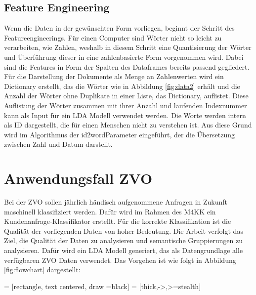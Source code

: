 \documentclass[german,version-2020-11]{uzl-thesis}
\begin{document}
\begin{itemize}
\subsection{Feature Engineering}
Wenn die Daten in der gewünschten Form vorliegen, beginnt der Schritt des Featureengineerings. Für einen Computer sind Wörter nicht so leicht zu verarbeiten, wie Zahlen, weshalb in diesem Schritt eine Quantisierung der Wörter und Überführung dieser in eine zahlenbasierte Form vorgenommen wird. Dabei sind die Features in Form der Spalten des Dataframes bereits passend gegliedert. Für die Darstellung der Dokumente als Menge an Zahlenwerten wird ein Dictionary erstellt, das die Wörter wie in Abbildung \ref{fig:data2} erhält und die Anzahl der Wörter ohne Duplikate in einer Liste, das Dictionary, auflistet. Diese Auflistung der Wörter zusammen mit ihrer Anzahl und laufenden Indexnummer kann als Input für ein LDA Modell verwendet werden. Die Worte werden intern als ID dargestellt, die für einen Menschen nicht zu verstehen ist. Aus diese Grund wird im Algorithmus der id2wordParameter eingeführt, der die Übersetzung zwischen Zahl und Datum darstellt. 

\section{Anwendungsfall ZVO}
Bei der ZVO sollen jährlich händisch aufgenommene Anfragen in Zukunft maschinell klassifiziert werden. Dafür wird im Rahmen des M4KK ein Kundenanfrage-Klassifikator erstellt. Für die korrekte Klassifikation ist die Qualität der vorliegenden Daten von hoher Bedeutung. Die Arbeit verfolgt das Ziel, die Qualität der Daten zu analysieren und semantische Gruppierungen zu analysieren. Dafür wird ein LDA Modell generiert, das als Datengrundlage alle verfügbaren ZVO Daten verwendet. Das Vorgehen ist wie folgt in Abbildung \ref{fig:flowchart} dargestellt:   

 = [rectangle, text centered, draw =black]
 = [thick,->,>=stealth]

\begin{figure}[H]
\begin{center}
\end{center}
\end{figure}
\end{itemize}
\end{document}
